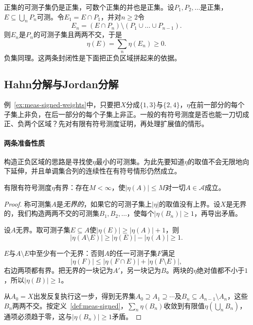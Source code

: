正集的可测子集仍是正集，可数个正集的并也是正集。设$P_1,P_2,\dots$是正集，$E\subseteq\bigcup_nP_n$可测。令$E_1=E\cap P_1$，并对$n\geq2$令
\[
 E_n=(E\cap P_n)\setminus(P_1\cup\dots\cup P_{n-1}).
\]
则$E_n$是$P_n$的可测子集且两两不交，于是
\[
 \eta(E)=\sum_n\eta(E_n)\geq0.
\]
负集同理。这两条封闭性是下面把正负区域拼起来的依据。

\subsection{Hahn分解与Jordan分解}
\label{sec:meas-hahn-jordan}

例~\ref{ex:meas-signed-weights}中，只要把$X$分成$\{1,3\}$与$\{2,4\}$，$\eta$在前一部分的每个子集上非负，在后一部分的每个子集上非正。一般的有符号测度是否也能一刀切成正、负两个区域？先对有限有符号测度证明，再处理扩展值的情形。

\paragraph{两条准备性质}
构造正负区域的思路是寻找使$\eta$最小的可测集。为此先要知道$\eta$的取值不会无限地向下延伸，并且单调集合列的连续性在有符号情形仍然成立。

\begin{lemma}[有限有符号测度有界]
\label{lem:meas-signed-bounded}
有限有符号测度$\eta$有界：存在$M<\infty$，使$\lvert\eta(A)\rvert\leq M$对一切$A\in\mathcal A$成立。
\end{lemma}

\begin{proof}
称可测集$A$是\emph{无界的}，如果它的可测子集上$\lvert\eta\rvert$的取值没有上界。设$X$是无界的，我们构造两两不交的可测集$B_1,B_2,\dots$，使每个$\lvert\eta(B_n)\rvert\geq1$，再导出矛盾。

设$A$无界。取可测子集$E\subseteq A$使$\lvert\eta(E)\rvert\geq\lvert\eta(A)\rvert+1$，则
\[
 \lvert\eta(A\setminus E)\rvert\geq\lvert\eta(E)\rvert-\lvert\eta(A)\rvert\geq1.
\]

$E$与$A\setminus E$中至少有一个无界：否则$A$的任一可测子集$F$满足
\[
 \lvert\eta(F)\rvert\leq\lvert\eta(F\cap E)\rvert+\lvert\eta(F\setminus E)\rvert,
\]
右边两项都有界。把无界的一块记为$A'$，另一块记为$B$。两块的$\eta$绝对值都不小于$1$，所以$\lvert\eta(B)\rvert\geq1$。

从$A_0=X$出发反复执行这一步，得到无界集$A_0\supseteq A_1\supseteq\cdots$及$B_n\subseteq A_{n-1}\setminus A_n$，这些$B_n$两两不交。按定义~\ref{def:meas-signed}，$\sum_n\eta(B_n)$收敛到有限值$\eta(\bigcup_nB_n)$，通项必须趋于零，这与$\lvert\eta(B_n)\rvert\geq1$矛盾。
\end{proof}

